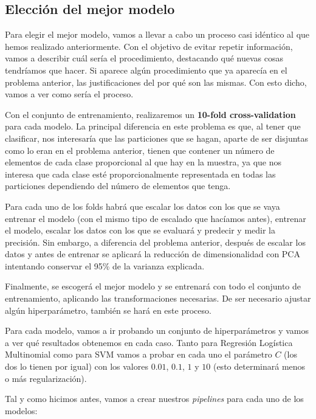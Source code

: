 \documentclass[11pt,a4paper]{article}
\begin{document}
    \subsection{Elección del mejor
modelo}\label{elecciuxf3n-del-mejor-modelo}

Para elegir el mejor modelo, vamos a llevar a cabo un proceso casi
idéntico al que hemos realizado anteriormente. Con el objetivo de evitar
repetir información, vamos a describir cuál sería el procedimiento,
destacando qué nuevas cosas tendríamos que hacer. Si aparece algún
procedimiento que ya aparecía en el problema anterior, las
justificaciones del por qué son las mismas. Con esto dicho, vamos a ver
como sería el proceso.

Con el conjunto de entrenamiento, realizaremos un \textbf{10-fold
cross-validation} para cada modelo. La principal diferencia en este
problema es que, al tener que clasificar, nos interesaría que las
particiones que se hagan, aparte de ser disjuntas como lo eran en el
problema anterior, tienen que contener un número de elementos de cada
clase proporcional al que hay en la muestra, ya que nos interesa que
cada clase esté proporcionalmente representada en todas las particiones
dependiendo del número de elementos que tenga.

Para cada uno de los folds habrá que escalar los datos con los que se
vaya entrenar el modelo (con el mismo tipo de escalado que hacíamos
antes), entrenar el modelo, escalar los datos con los que se evaluará y
predecir y medir la precisión. Sin embargo, a diferencia del problema
anterior, después de escalar los datos y antes de entrenar se aplicará
la reducción de dimensionalidad con PCA intentando conservar el 95\% de
la varianza explicada.

Finalmente, se escogerá el mejor modelo y se entrenará con todo el
conjunto de entrenamiento, aplicando las transformaciones necesarias. De
ser necesario ajustar algún hiperparámetro, también se hará en este
proceso.

Para cada modelo, vamos a ir probando un conjunto de hiperparámetros y
vamos a ver qué resultados obtenemos en cada caso. Tanto para Regresión
Logística Multinomial como para SVM vamos a probar en cada uno el
parámetro \(C\) (los dos lo tienen por igual) con los valores \(0.01\),
\(0.1\), \(1\) y \(10\) (esto determinará menos o más regularización).

Tal y como hicimos antes, vamos a crear nuestros \textit{pipelines} para cada uno
de los modelos:
\end{document}
